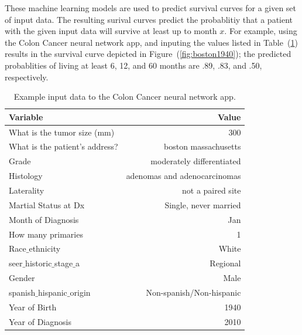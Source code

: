 \documentclass[a4paper,11pt]{article}
\begin{document}
These machine learning models are used to predict survival curves for a given set of input data. 
The resulting surival curves predict the probablitiy that a patient with the given input data will survive at least up to month $x$. For example, using the Colon Cancer neural network app, and 
inputing the values listed in Table~(\ref{tab:boston1940}) results in the survival curve depicted in Figure~(\ref{fig:boston1940}); the predicted probablities of living 
at least 6, 12, and 60 months are .89, .83, and .50, respectively.


\begin{table}[H]
\begin{center}
\begin{tabular}{lr}
\toprule
  Variable  & Value \\ 
\midrule
  What is the tumor size (mm) & 300 \\  
  What is the patient's address? & boston massachusetts \\ 
  Grade & moderately differentiated \\  
  Histology & adenomas and adenocarcinomas \\ 
  Laterality & not a paired site \\  
 Martial Status at Dx & Single, never married \\  
 Month of Diagnosis & Jan \\  
 How many primaries & 1 \\  
  Race$\_$ethnicity & White \\  
  seer$\_$historic$\_$stage$\_$a  & Regional \\ 
  Gender & Male \\  
  spanish$\_$hispanic$\_$origin & Non-spanish/Non-hispanic \\ 
 Year of Birth & 1940 \\  
  Year of Diagnosis & 2010 \\
\bottomrule
\end{tabular}
\caption{Example input data to the Colon Cancer neural network app.}
\label{tab:boston1940}
\end{center}
\end{table}
\end{document}
